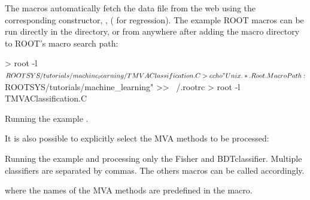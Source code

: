 The macros automatically fetch the data file from
the web using the corresponding  constructor, \eg,
 ( for regression). The example %
ROOT macros can be run directly in the \TmvaTutorialDir directory,
or from anywhere after adding the macro directory
to ROOT's macro search path:
\begin{codeexample}
\begin{tmvacode}
> root -l $ROOTSYS/tutorials/machine_learning/TMVAClassification.C
> echo "Unix.*.Root.MacroPath: $ROOTSYS/tutorials/machine_learning" >> ~/.rootrc
> root -l TMVAClassification.C
\end{tmvacode}
\caption[.]{\codeexampleCaptionSize Running the example .}
\end{codeexample}

It is also possible to explicitly select the MVA methods to be processed:
\begin{codeexample}
\caption[.]{\codeexampleCaptionSize Running the example  and processing only the Fisher and BDTclassifier. Multiple classifiers are separated by commas. The others macros can be called accordingly.}
\end{codeexample}
where the names of the MVA methods are predefined in the macro.

